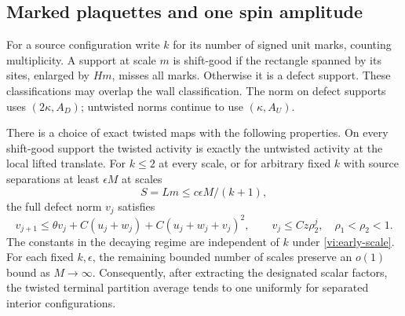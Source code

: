 \subsection{Marked plaquettes and one spin amplitude}

For a source configuration write $k$ for its number of signed unit marks,
counting multiplicity.  A support at scale $m$ is shift-good if the
rectangle spanned by its sites, enlarged by $Hm$, misses all marks.
Otherwise it is a defect support.  These classifications may overlap
the wall classification.  The norm on defect supports uses
$(2\kappa,A_D)$; untwisted norms continue to use $(\kappa,A_U)$.

\begin{proposition}
\label{vi:marked-flow}
There is a choice of exact twisted maps with the following properties.
On every shift-good support the twisted activity is exactly the
untwisted activity at the local lifted translate.  For $k\le2$ at every
scale, or for arbitrary fixed $k$ with source separations at least
$\epsilon M$ at scales
\begin{equation}
 S=Lm\le c\epsilon M/(k+1),                              \label{vi:early-scale}
\end{equation}
the full defect norm $v_j$ satisfies
\begin{equation}
 v_{j+1}\le\theta v_j+C(u_j+w_j)
                         +C(u_j+w_j+v_j)^2,\qquad
 v_j\le Cz\rho_2^j,\quad \rho_1<\rho_2<1.              \label{vi:defect-map}
\end{equation}
The constants in the decaying regime are independent of $k$ under
\eqref{vi:early-scale}.  For each fixed $k,\epsilon$, the remaining
bounded number of scales preserve an $o(1)$ bound as $M\to\infty$.
Consequently, after extracting the designated scalar factors, the
twisted terminal partition average tends to one uniformly for separated
interior configurations.
\end{proposition}

